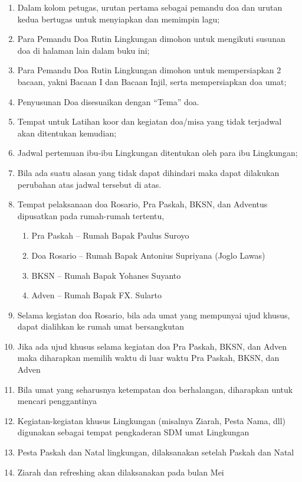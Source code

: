 \begin{enumerate}
\item Dalam kolom petugas, urutan pertama sebagai pemandu doa dan urutan
kedua bertugas untuk menyiapkan dan memimpin lagu;
\item Para Pemandu Doa Rutin Lingkungan dimohon untuk mengikuti susunan
doa di halaman lain dalam buku ini;
\item Para Pemandu Doa Rutin Lingkungan dimohon untuk mempersiapkan 2
bacaan, yakni Bacaan I dan Bacaan Injil, serta mempersiapkan doa umat;
\item Penyusunan Doa disesuaikan dengan
{\textquotedblleft}Tema{\textquotedblright} doa. 
\item Tempat untuk Latihan koor dan kegiatan doa/misa yang tidak
terjadwal akan ditentukan kemudian;
\item Jadwal pertemuan ibu-ibu Lingkungan ditentukan oleh para ibu
Lingkungan;
\item Bila ada suatu alasan yang tidak dapat dihindari maka dapat
dilakukan perubahan atas jadwal tersebut di atas. 
\item Tempat pelaksanaan doa Rosario, Pra Paskah, BKSN, dan Adventus dipusatkan pada rumah-rumah tertentu,
\begin{enumerate}
\item Pra Paskah -- Rumah Bapak Paulus Suroyo
\item Doa Rosario -- Rumah Bapak Antonius Supriyana (Joglo Lawas)
\item BKSN -- Rumah Bapak Yohanes Suyanto
\item Adven -- Rumah Bapak FX. Sularto
\end{enumerate}

\item Selama kegiatan doa Rosario, bila ada umat yang mempunyai ujud khusus, dapat dialihkan ke rumah umat bersangkutan
\item Jika ada ujud khusus selama kegiatan doa Pra Paskah, BKSN, dan Adven maka diharapkan memilih waktu di luar waktu Pra Paskah, BKSN, dan Adven
\item Bila umat yang seharusnya ketempatan doa berhalangan, diharapkan untuk
mencari penggantinya
\item Kegiatan-kegiatan khusus Lingkungan (misalnya Ziarah, Pesta Nama, dll) digunakan sebagai tempat pengkaderan SDM umat Lingkungan 
\item Pesta Paskah dan Natal lingkungan, dilaksanakan setelah Paskah dan Natal
\item Ziarah dan refreshing akan dilaksanakan pada bulan Mei
\end{enumerate}

